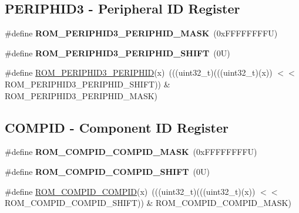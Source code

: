 \subsection*{P\+E\+R\+I\+P\+H\+I\+D3 -\/ Peripheral ID Register}
\begin{DoxyCompactItemize}
\item 
\mbox{\label{group___m_t_b___register___masks_ga0f7212db2daf16bb9cd76004eef1f845}} 
\#define {\bfseries R\+O\+M\+\_\+\+P\+E\+R\+I\+P\+H\+I\+D3\+\_\+\+P\+E\+R\+I\+P\+H\+I\+D\+\_\+\+M\+A\+SK}~(0x\+F\+F\+F\+F\+F\+F\+F\+F\+U)
\item 
\mbox{\label{group___m_t_b___register___masks_ga61106adc7eb36f078c312d6111da5941}} 
\#define {\bfseries R\+O\+M\+\_\+\+P\+E\+R\+I\+P\+H\+I\+D3\+\_\+\+P\+E\+R\+I\+P\+H\+I\+D\+\_\+\+S\+H\+I\+FT}~(0\+U)
\item 
\#define \mbox{\hyperlink{group___m_t_b___register___masks_gaa9d92ba0e5acb77de8834d3c921ae4e3}{R\+O\+M\+\_\+\+P\+E\+R\+I\+P\+H\+I\+D3\+\_\+\+P\+E\+R\+I\+P\+H\+ID}}(x)~(((uint32\+\_\+t)(((uint32\+\_\+t)(x)) $<$$<$ R\+O\+M\+\_\+\+P\+E\+R\+I\+P\+H\+I\+D3\+\_\+\+P\+E\+R\+I\+P\+H\+I\+D\+\_\+\+S\+H\+I\+FT)) \& R\+O\+M\+\_\+\+P\+E\+R\+I\+P\+H\+I\+D3\+\_\+\+P\+E\+R\+I\+P\+H\+I\+D\+\_\+\+M\+A\+SK)
\end{DoxyCompactItemize}
\subsection*{C\+O\+M\+P\+ID -\/ Component ID Register}
\begin{DoxyCompactItemize}
\item 
\mbox{\label{group___m_t_b___register___masks_gae20c6541595b7ae93be71b45403230b7}} 
\#define {\bfseries R\+O\+M\+\_\+\+C\+O\+M\+P\+I\+D\+\_\+\+C\+O\+M\+P\+I\+D\+\_\+\+M\+A\+SK}~(0x\+F\+F\+F\+F\+F\+F\+F\+F\+U)
\item 
\mbox{\label{group___m_t_b___register___masks_ga348650897eca9cb7d75adcf78efceb33}} 
\#define {\bfseries R\+O\+M\+\_\+\+C\+O\+M\+P\+I\+D\+\_\+\+C\+O\+M\+P\+I\+D\+\_\+\+S\+H\+I\+FT}~(0\+U)
\item 
\#define \mbox{\hyperlink{group___m_t_b___register___masks_gaa2a70f721f69f2c2111320ee1d37e673}{R\+O\+M\+\_\+\+C\+O\+M\+P\+I\+D\+\_\+\+C\+O\+M\+P\+ID}}(x)~(((uint32\+\_\+t)(((uint32\+\_\+t)(x)) $<$$<$ R\+O\+M\+\_\+\+C\+O\+M\+P\+I\+D\+\_\+\+C\+O\+M\+P\+I\+D\+\_\+\+S\+H\+I\+FT)) \& R\+O\+M\+\_\+\+C\+O\+M\+P\+I\+D\+\_\+\+C\+O\+M\+P\+I\+D\+\_\+\+M\+A\+SK)
\end{DoxyCompactItemize}
